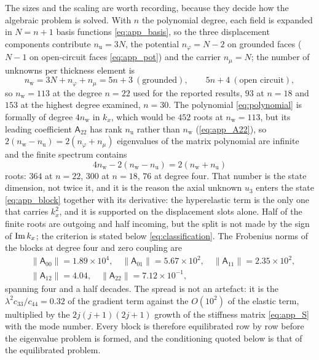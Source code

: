 The sizes and the scaling are worth recording, because they decide how the
algebraic problem is solved.  With $n$ the polynomial degree, each field is
expanded in $N=n+1$ basis functions \eqref{eq:app_basis}, so the three
displacement components contribute $n_{\mathrm u}=3N$, the potential
$n_\varphi=N-2$ on grounded faces ($N-1$ on open-circuit faces \eqref{eq:app_pot})
and the carrier $n_\mu=N$; the number of unknowns per thickness element is
\begin{equation}
\label{eq:nw}
n_{\mathrm{w}}=3N+n_\varphi+n_\mu=5n+3\ (\text{grounded}),\qquad
5n+4\ (\text{open circuit}),
\end{equation}
so $n_{\mathrm{w}}=113$ at the degree $n=22$ used for the reported results,
$93$ at $n=18$ and $153$ at the highest degree examined, $n=30$.  The polynomial
\eqref{eq:polynomial} is formally of degree $4n_{\mathrm{w}}$ in $k_x$, which
would be $452$ roots at $n_{\mathrm{w}}=113$, but its leading coefficient
$\mathsf A_{22}$ has rank $n_{\mathrm u}$ rather than $n_{\mathrm{w}}$
(\eqref{eq:app_A22}), so $2(n_{\mathrm{w}}-n_{\mathrm u})=2(n_\varphi+n_\mu)$
eigenvalues of the matrix polynomial are infinite and the finite spectrum
contains
\begin{equation}
\label{eq:finite_roots}
4n_{\mathrm{w}}-2(n_{\mathrm{w}}-n_{\mathrm u})=2(n_{\mathrm{w}}+n_{\mathrm u})
\end{equation}
roots: $364$ at $n=22$, $300$ at $n=18$, $76$ at degree four.  That number is the
state dimension, not twice it, and it is the reason the axial unknown $u_3$ enters
the state \eqref{eq:app_block} together with its derivative: the hyperelastic term
is the only one that carries $k_x^{2}$, and it is supported on the displacement
slots alone.  Half of the finite roots are outgoing and half incoming, but the
split is not made by the sign of $\operatorname{Im} k_x$; the criterion is stated below
\eqref{eq:classification}.  The Frobenius norms of the blocks at degree
four and zero coupling are
\begin{equation}
\label{eq:block_norms}
\begin{aligned}
&\|\mathsf A_{00}\|=1.89\times10^{4},\quad
\|\mathsf A_{01}\|=5.67\times10^{2},\quad
\|\mathsf A_{11}\|=2.35\times10^{2},\\
&\|\mathsf A_{12}\|=4.04,\quad
\|\mathsf A_{22}\|=7.12\times10^{-1},
\end{aligned}
\end{equation}
spanning four and a half decades.  The spread is not an artefact: it is the
$\lambda^2c_{33}/c_{44}=0.32$ of the gradient term against the $O(10^{2})$ of
the elastic term, multiplied by the $2j(j+1)(2j+1)$ growth of the stiffness
matrix \eqref{eq:app_S} with the mode number.  Every block is therefore
equilibrated row by row before the eigenvalue problem is formed, and the
conditioning quoted below is that of the equilibrated problem.

